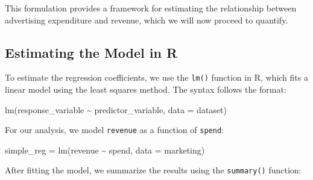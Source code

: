 \documentclass[
  11pt,
]{book}
\makeatletter
\newenvironment{Shaded}{}{}
\newcommand{\AttributeTok}[1]{#1}
\newcommand{\FunctionTok}[1]{#1}
\newcommand{\NormalTok}[1]{#1}
\newcommand{\OtherTok}[1]{\textcolor[rgb]{0.39,0.39,0.39}{#1}}
\newcommand{\SpecialCharTok}[1]{\textcolor[rgb]{0.39,0.39,0.39}{#1}}
\newenvironment{kframe}{%
\medskip{}
\setlength{\fboxsep}{.8em}
 \def\at@end@of@kframe{}%
 \ifinner\ifhmode%
  \def\at@end@of@kframe{\end{minipage}}%
  \begin{minipage}{\columnwidth}%
 \fi\fi%
 \def\FrameCommand##1{\hskip\@totalleftmargin \hskip-\fboxsep
 \colorbox{shadecolor}{##1}\hskip-\fboxsep
     \hskip-\linewidth \hskip-\@totalleftmargin \hskip\columnwidth}%
 \MakeFramed {\advance\hsize-\width
   \@totalleftmargin\z@ \linewidth\hsize
   \@setminipage}}%
 {\par\unskip\endMakeFramed%
 \at@end@of@kframe}
\renewenvironment{Shaded}{\begin{kframe}}{\end{kframe}}
\theoremstyle{definition}
\theoremstyle{definition}
\theoremstyle{definition}
\theoremstyle{definition}
\theoremstyle{remark}
\makeatother
\begin{document}
This formulation provides a framework for estimating the relationship between advertising expenditure and revenue, which we will now proceed to quantify.

\subsection*{Estimating the Model in R}\label{estimating-the-model-in-r}


To estimate the regression coefficients, we use the \texttt{lm()} function in R, which fits a linear model using the least squares method. The syntax follows the format:

\begin{Shaded}
\begin{Highlighting}[]
\FunctionTok{lm}\NormalTok{(response\_variable }\SpecialCharTok{\textasciitilde{}}\NormalTok{ predictor\_variable, }\AttributeTok{data =}\NormalTok{ dataset)}
\end{Highlighting}
\end{Shaded}

For our analysis, we model \texttt{revenue} as a function of \texttt{spend}:

\begin{Shaded}
\begin{Highlighting}[]
\NormalTok{simple\_reg }\OtherTok{=} \FunctionTok{lm}\NormalTok{(revenue }\SpecialCharTok{\textasciitilde{}}\NormalTok{ spend, }\AttributeTok{data =}\NormalTok{ marketing)}
\end{Highlighting}
\end{Shaded}

After fitting the model, we summarize the results using the \texttt{summary()} function:
\end{document}
